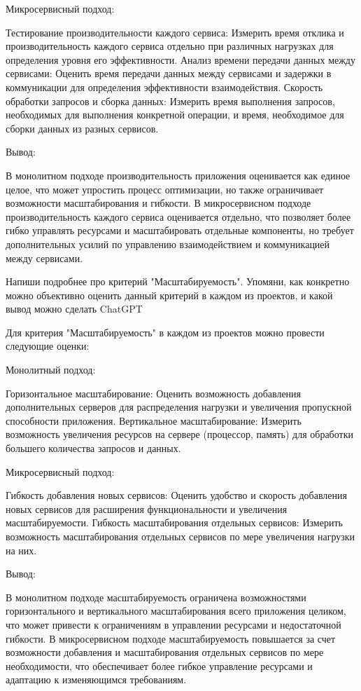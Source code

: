 Микросервисный подход:

    Тестирование производительности каждого сервиса: Измерить время отклика и производительность каждого сервиса отдельно при различных нагрузках для определения уровня его эффективности.
    Анализ времени передачи данных между сервисами: Оценить время передачи данных между сервисами и задержки в коммуникации для определения эффективности взаимодействия.
    Скорость обработки запросов и сборка данных: Измерить время выполнения запросов, необходимых для выполнения конкретной операции, и время, необходимое для сборки данных из разных сервисов.

Вывод:

    В монолитном подходе производительность приложения оценивается как единое целое, что может упростить процесс оптимизации, но также ограничивает возможности масштабирования и гибкости.
    В микросервисном подходе производительность каждого сервиса оценивается отдельно, что позволяет более гибко управлять ресурсами и масштабировать отдельные компоненты, но требует дополнительных усилий по управлению взаимодействием и коммуникацией между сервисами.

Напиши подробнее про критерий "Масштабируемость". Упомяни, как конкретно можно объективно оценить данный критерий в каждом из проектов, и какой вывод можно сделать
ChatGPT

Для критерия "Масштабируемость" в каждом из проектов можно провести следующие оценки:

Монолитный подход:

    Горизонтальное масштабирование: Оценить возможность добавления дополнительных серверов для распределения нагрузки и увеличения пропускной способности приложения.
    Вертикальное масштабирование: Измерить возможность увеличения ресурсов на сервере (процессор, память) для обработки большего количества запросов и данных.

Микросервисный подход:

    Гибкость добавления новых сервисов: Оценить удобство и скорость добавления новых сервисов для расширения функциональности и увеличения масштабируемости.
    Гибкость масштабирования отдельных сервисов: Измерить возможность масштабирования отдельных сервисов по мере увеличения нагрузки на них.

Вывод:

    В монолитном подходе масштабируемость ограничена возможностями горизонтального и вертикального масштабирования всего приложения целиком, что может привести к ограничениям в управлении ресурсами и недостаточной гибкости.
    В микросервисном подходе масштабируемость повышается за счет возможности добавления и масштабирования отдельных сервисов по мере необходимости, что обеспечивает более гибкое управление ресурсами и адаптацию к изменяющимся требованиям.

